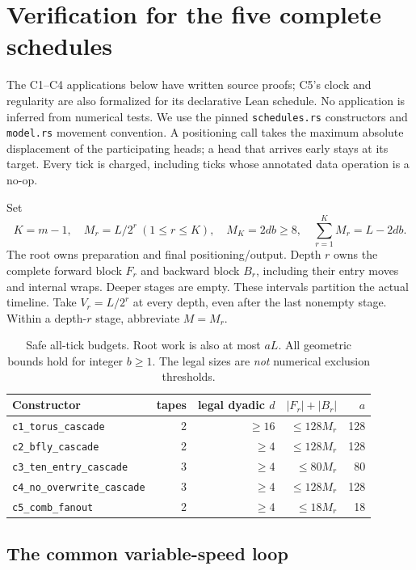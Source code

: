 \section{Verification for the five complete schedules}
\label{sec:schedules}

The C1--C4 applications below have written source proofs; C5's clock and
regularity are also formalized for its declarative Lean schedule. No
application is inferred from numerical tests. We use the pinned
\texttt{schedules.rs} constructors and
\texttt{model.rs} movement convention. A positioning call takes the maximum
absolute displacement of the participating heads; a head that arrives
early stays at its target. Every tick is charged, including ticks whose
annotated data operation is a no-op.

Set
\[
 K=m-1,\quad M_r=L/2^r\ (1\le r\le K),\quad
 M_K=2db\ge8,\quad \sum_{r=1}^K M_r=L-2db.
\]
The root owns preparation and final positioning/output. Depth $r$ owns
the complete forward block $F_r$ and backward block $B_r$, including their
entry moves and internal wraps. Deeper stages are empty. These intervals
partition the actual timeline. Take $V_r=L/2^r$ at every depth, even after
the last nonempty stage. Within a depth-$r$ stage, abbreviate $M=M_r$.

\begin{table}[htbp]
\centering\small
\begin{tabular}{lrrrr}
\toprule
Constructor & tapes & legal dyadic $d$ & $|F_r|+|B_r|$ & $a$ \\
\midrule
\texttt{c1\_torus\_cascade} & 2 & $\ge16$ & $\le128M_r$ & 128 \\
\texttt{c2\_bfly\_cascade} & 2 & $\ge4$ & $\le128M_r$ & 128 \\
\texttt{c3\_ten\_entry\_cascade} & 3 & $\ge4$ & $\le80M_r$ & 80 \\
\texttt{c4\_no\_overwrite\_cascade} & 3 & $\ge4$ & $\le128M_r$ & 128 \\
\texttt{c5\_comb\_fanout} & 2 & $\ge4$ & $\le18M_r$ & 18 \\
\bottomrule
\end{tabular}
\caption{Safe all-tick budgets. Root work is also at most $aL$.
All geometric bounds hold for integer $b\ge1$. The legal sizes are
\emph{not} numerical exclusion thresholds.}
\label{tab:bounds}
\end{table}

\subsection{The common variable-speed loop}
\label{sec:variable}

